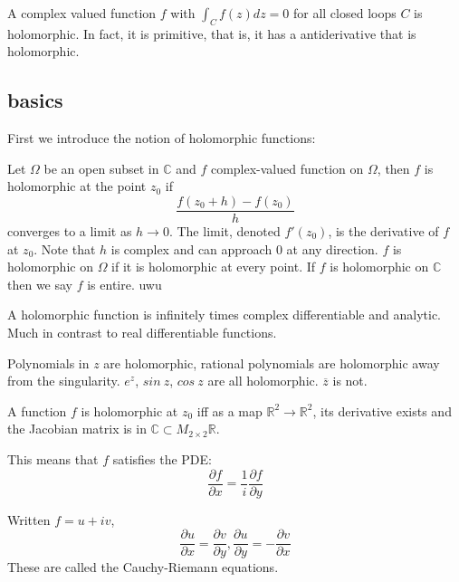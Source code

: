 \documentclass[main.tex]{subfiles}
\begin{document}
\begin{theorem}
A complex valued function $f$ with $\int_C f(z) dz = 0$ for all closed loops $C$ is holomorphic. In fact, it is primitive, that is, it has a antiderivative that is holomorphic.
\end{theorem}

\subsection{basics}

First we introduce the notion of holomorphic functions:

\begin{definition}
Let $\Omega$ be an open subset in $\mathbb{C}$ and $f$ complex-valued function on $\Omega$, then $f$ is holomorphic at the point $z_0$ if 
$$
\frac{f(z_0 + h) - f(z_0)}{h}
$$
converges to a limit as $h \rightarrow 0$. The limit, denoted $f'(z_0)$, is the derivative of $f$ at $z_0$. Note that $h$ is complex and can approach $0$ at any direction. $f$ is holomorphic on $\Omega$ if it is holomorphic at every point. If $f$ is holomorphic on $\mathbb{C}$ then we say $f$ is entire. uwu
\end{definition}

\begin{remark}
A holomorphic function is infinitely times complex differentiable and analytic. Much in contrast to real differentiable functions.
\end{remark}

\begin{example} 
Polynomials in $z$ are holomorphic, rational polynomials are holomorphic away from the singularity. $e^z$, $sin \ z$, $cos \ z$ are all holomorphic. $\overline{z}$ is not. 
\end{example}

A function $f$ is holomorphic at $z_0$ iff as a map $\mathbb{R}^2 \rightarrow \mathbb{R}^2$, its derivative exists and the Jacobian matrix is in $\mathbb{C} \subset M_{2 \times 2}\mathbb{R}$.

This means that $f$ satisfies the PDE:
$$
\frac{\partial f}{\partial x} = \frac{1}{i} \frac{\partial f}{\partial y}
$$

Written $f = u + iv$, 
$$
\frac{\partial u}{\partial x} = \frac{\partial v}{\partial y}, \frac{\partial u}{\partial y} = -\frac{\partial v}{\partial x}
$$
These are called the Cauchy-Riemann equations.
\end{document}
